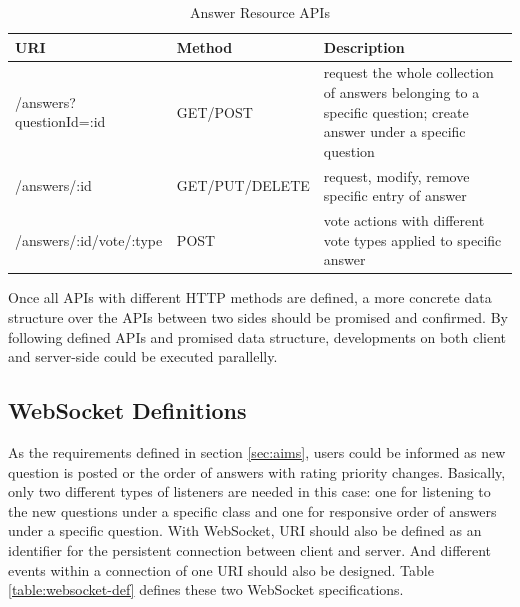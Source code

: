 \begin{itemize}
\begin{table}[!htbp]
\begin{tabularx}{\textwidth}{@{}llX@{}}
\toprule
URI                                 & Method         & Description                                                                                                                                                 \\ \midrule
/answers?questionId=:id             & GET/POST       & request the whole collection of answers belonging to a specific question; create answer under a specific question\\
/answers/:id                        & GET/PUT/DELETE & request, modify, remove specific entry of answer                                                                                                            \\
/answers/:id/vote/:type             & POST           & vote actions with different vote types applied to specific answer                                                                                           \\ \bottomrule
\end{tabularx}
\caption{Answer Resource APIs}
\label{table:answer-resources-apis}
\end{table}

\end{itemize}

Once all APIs with different HTTP methods are defined, a more concrete data structure over the APIs between two sides should be promised and confirmed. By following defined APIs and promised data structure, developments on both client and server-side could be executed parallelly.

\subsection{WebSocket Definitions} \label{subsection:websocket-definition-data-concept}

As the requirements defined in section \ref{sec:aims}, users could be informed as new question is posted or the order of answers with rating priority changes. Basically, only two different types of listeners are needed in this case: one for listening to the new questions under a specific class and one for responsive order of answers under a specific question. With WebSocket, URI should also be defined as an identifier for the persistent connection between client and server. And different events within a connection of one URI should also be designed. Table \ref{table:websocket-def} defines these two WebSocket specifications.

